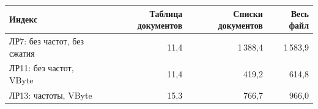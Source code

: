 \begin{tabular}{|l|r|r|r|}
\hline
Индекс & Таблица документов & Списки документов & Весь файл \\
\hline
ЛР7: без частот, без сжатия & 11,4 & 1\,388,4 & 1\,583,9 \\
\hline
ЛР11: без частот, VByte & 11,4 & 419,2 & 614,8 \\
\hline
ЛР13: частоты, VByte & 15,3 & 766,7 & 966,0 \\
\hline
\end{tabular}

